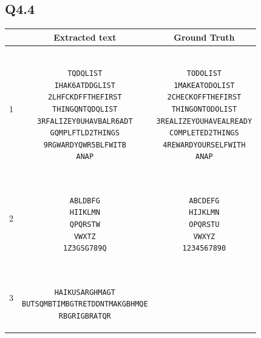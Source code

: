 \documentclass{article} %
\begin{document}
    \subsection*{Q4.4}
    \bgroup
    \begin{tabular}{||c||c|c||}
        \hline\hline
        & Extracted text & Ground Truth \\
        \hline\hline 
        1 &
\begin{minipage}{0.4\textwidth}\begin{verbatim}

TQDQLIST
IHAK6ATDDGLIST
2LHFCKDFFTHEFIRST
THINGQNTQDQLIST
3RFALIZEY0UHAVBALR6ADT
GQMPLFTLD2THINGS
9RGWARDYQWR5BLFWITB
ANAP

\end{verbatim}\end{minipage}
        &
\begin{minipage}{0.4\textwidth}\begin{verbatim}

TODOLIST
1MAKEATODOLIST
2CHECKOFFTHEFIRST
THINGONTODOLIST
3REALIZEYOUHAVEALREADY
COMPLETED2THINGS
4REWARDYOURSELFWITH
ANAP

\end{verbatim}\end{minipage} \\
\hline
2 &
\begin{minipage}{0.4\textwidth}\begin{verbatim}

ABLDBFG
HIIKLMN
QPQRSTW
VWXTZ
1Z3GSG789Q

\end{verbatim}\end{minipage}
        &
\begin{minipage}{0.4\textwidth}\begin{verbatim}

ABCDEFG
HIJKLMN
OPQRSTU
VWXYZ
1234567890

\end{verbatim}\end{minipage} \\
\hline
3 &
\begin{minipage}{0.4\textwidth}\begin{verbatim}

HAIKUSARGHMAGT
BUTSQMBTIMBGTRETDDNTMAKGBHMQE
RBGRIGBRATQR

\end{verbatim}\end{minipage}
        &
\begin{minipage}{0.4\textwidth}\begin{verbatim}


\end{verbatim}
\end{minipage}
\end{tabular}
\end{document}

